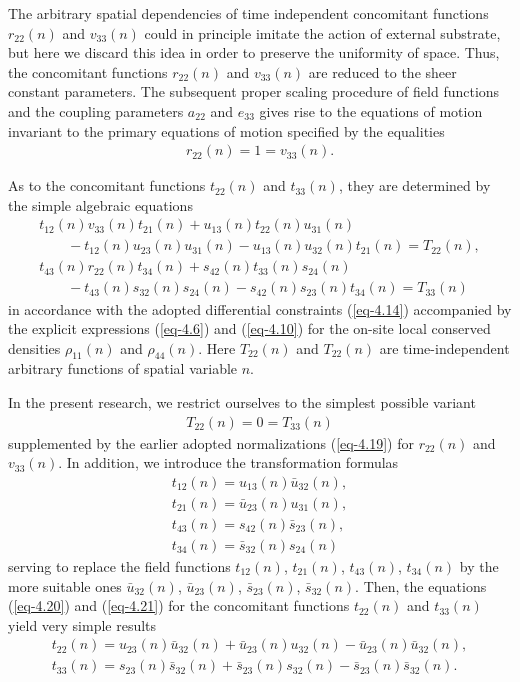 \documentclass[pdftex]{sigma}
\numberwithin{equation}{section}
\begin{document}
The arbitrary spatial dependencies of time independent concomitant functions~$r_{22}(n)$ and $v_{33}(n)$ could in principle imitate the action of external substrate, but here we discard this idea in order to preserve the uniformity of space. Thus, the concomitant functions $r_{22}(n)$ and $v_{33}(n)$ are reduced to the sheer constant parameters. The subsequent proper scaling procedure of field functions and the coupling parameters $a_{22}$ and $e_{33}$ gives rise to the equations of motion invariant to the primary equations of motion specified by the equalities
\begin{gather}\label{eq-4.19}
	r_{22}(n)=1=v_{33}(n) .
\end{gather}

As to the concomitant functions $t_{22}(n)$ and $t_{33}(n)$, they are determined by the simple algebraic equations
\begin{gather}
 t_{12}(n)v_{33}(n)t_{21}(n)+u_{13}(n)t_{22}(n)u_{31}(n)\nonumber\\
 \qquad{} -t_{12}(n)u_{23}(n)u_{31}(n)-u_{13}(n)u_{32}(n)t_{21}(n) = T_{22}(n),\label{eq-4.20}
\\
	t_{43}(n)r_{22}(n)t_{34}(n)+s_{42}(n)t_{33}(n)s_{24}(n)\nonumber\\
	\qquad{} -t_{43}(n)s_{32}(n)s_{24}(n)-s_{42}(n)s_{23}(n)t_{34}(n) = T_{33}(n)\label{eq-4.21}
\end{gather}
in accordance with the adopted differential constraints (\ref{eq-4.14}) accompanied by the explicit expressions (\ref{eq-4.6}) and (\ref{eq-4.10}) for the on-site local conserved densities $\rho_{11}(n)$ and $\rho_{44}(n)$.
Here $T_{22}(n)$ and $T_{22}(n)$ are time-independent arbitrary functions of spatial variable $n$.

In the present research, we restrict ourselves to the simplest possible variant
\begin{gather}\label{eq-4.22a}
	T_{22}(n) = 0 = T_{33}(n)
\end{gather}
supplemented by the earlier adopted normalizations (\ref{eq-4.19}) for $r_{22}(n)$ and $v_{33}(n)$. In addition, we introduce the transformation formulas
\begin{gather}\label{eq-4.22}
	t_{12}(n)=u_{13}(n)\bar{u}_{32}(n),
\\ \label{eq-4.24}
	t_{21}(n)=\bar{u}_{23}(n)u_{31}(n),
\\ \label{eq-4.25}
	t_{43}(n)=s_{42}(n)\bar{s}_{23}(n),
\\ \label{eq-4.26}
	t_{34}(n)=\bar{s}_{32}(n)s_{24}(n)
\end{gather}
serving to replace the field functions $t_{12}(n)$, $t_{21}(n)$, $t_{43}(n)$, $t_{34}(n)$ by the more suitable ones $\bar{u}_{32}(n)$, $\bar{u}_{23}(n)$, $\bar{s}_{23}(n)$, $\bar{s}_{32}(n)$. Then, the equations (\ref{eq-4.20}) and (\ref{eq-4.21}) for the concomitant functions $t_{22}(n)$ and $t_{33}(n)$ yield very simple results
\begin{gather*}%
	t_{22}(n)=u_{23}(n)\bar{u}_{32}(n)+\bar{u}_{23}(n)u_{32}(n)-\bar{u}_{23}(n)\bar{u}_{32}(n),
\\ %
	t_{33}(n)=s_{23}(n)\bar{s}_{32}(n) + \bar{s}_{23}(n)s_{32}(n) - \bar{s}_{23}(n)\bar{s}_{32}(n) .
\end{gather*}
\end{document}
